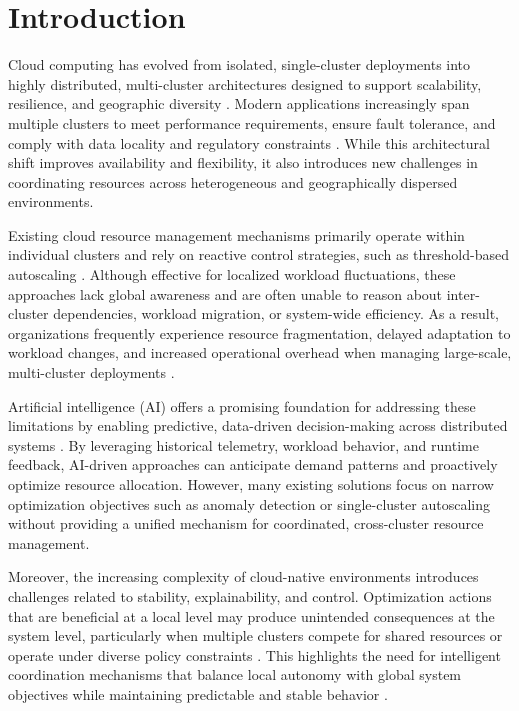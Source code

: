 \documentclass[conference]{IEEEtran}
\begin{document}
\section{Introduction}

Cloud computing has evolved from isolated, single-cluster deployments into highly distributed, multi-cluster architectures designed to support scalability, resilience, and geographic diversity \cite{armbrust2010view}. Modern applications increasingly span multiple clusters to meet performance requirements, ensure fault tolerance, and comply with data locality and regulatory constraints \cite{burns2016borg}
. While this architectural shift improves availability and flexibility, it also introduces new challenges in coordinating resources across heterogeneous and geographically dispersed environments.

Existing cloud resource management mechanisms primarily operate within individual clusters and rely on reactive control strategies, such as threshold-based autoscaling \cite{verma2015large}. Although effective for localized workload fluctuations, these approaches lack global awareness and are often unable to reason about inter-cluster dependencies, workload migration, or system-wide efficiency. As a result, organizations frequently experience resource fragmentation, delayed adaptation to workload changes, and increased operational overhead when managing large-scale, multi-cluster deployments \cite{hindman2011mesos, Kirubakaran_IRJET_2025}.

Artificial intelligence (AI) offers a promising foundation for addressing these limitations by enabling predictive, data-driven decision-making across distributed systems \cite{mao2016resource}. By leveraging historical telemetry, workload behavior, and runtime feedback, AI-driven approaches can anticipate demand patterns and proactively optimize resource allocation. However, many existing solutions focus on narrow optimization objectives such as anomaly detection or single-cluster autoscaling without providing a unified mechanism for coordinated, cross-cluster resource management.

Moreover, the increasing complexity of cloud-native environments introduces challenges related to stability, explainability, and control. Optimization actions that are beneficial at a local level may produce unintended consequences at the system level, particularly when multiple clusters compete for shared resources or operate under diverse policy constraints \cite{gmach2009resource}. This highlights the need for intelligent coordination mechanisms that balance local autonomy with global system objectives while maintaining predictable and stable behavior \cite{xu2018experience}.
\end{document}
